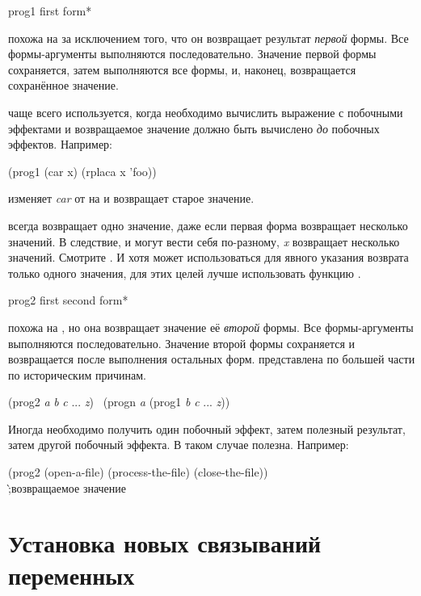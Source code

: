 \begin{defmac}
prog1 first {form}*

 похожа на  за исключением того, что он возвращает
результат \emph{первой} формы. Все формы-аргументы выполняются
последовательно. Значение первой формы сохраняется, затем выполняются все формы,
и, наконец, возвращается сохранённое значение.

 чаще всего используется, когда необходимо вычислить выражение с
побочными эффектами и возвращаемое значение должно быть вычислено \emph{до}
побочных эффектов.
Например:
\begin{lisp}
(prog1 (car x) (rplaca x 'foo))
\end{lisp}
изменяет \emph{car} от  на  и возвращает старое значение.

 всегда возвращает одно значение, даже если первая форма возвращает
несколько значений.
В следствие,  и  могут вести себя
по-разному, \emph{x} возвращает несколько значений. Смотрите .
И хотя  может использоваться для явного указания возврата только
одного значения, для этих целей лучше использовать функцию .
\end{defmac}

\begin{defmac}
prog2 first second {form}*

 похожа на , но она возвращает значение её \emph{второй}
формы. Все формы-аргументы выполняются последовательно. Значение второй формы
сохраняется и возвращается после выполнения остальных форм.
 представлена по большей части по историческим причинам.
\begin{lisp}
(prog2 \emph{a} \emph{b} \emph{c} ... \emph{z}) \EQ\ (progn \emph{a} (prog1 \emph{b} \emph{c} ... \emph{z}))
\end{lisp}
Иногда необходимо получить один побочный эффект, затем полезный результат, затем
другой побочный эффекта. В таком случае  полезна.
Например:
\begin{lisp}
(prog2 (open-a-file) (process-the-file) (close-the-file)) \\
\`;\textrm{возвращаемое значение }
\end{lisp}
\end{defmac}

\section{Установка новых связываний переменных}
\label{VAR-BINDING-SECTION}

